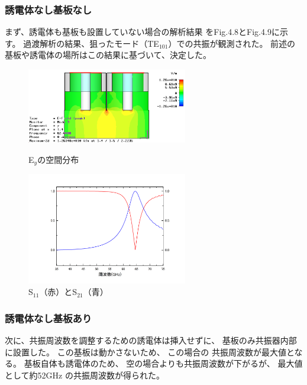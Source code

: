 \subsubsection{誘電体なし基板なし}
まず、誘電体も基板も設置していない場合の解析結果
をFig.4.8とFig.4.9に示す。
過渡解析の結果、狙ったモード（TE$_{101}$）での共振が観測された。
前述の基板や誘電体の場所はこの結果に基づいて、決定した。

\begin{figure}[h]
 \begin{minipage}{0.5\hsize}
  \begin{center}
   \includegraphics[width=70mm]{./image/model73_vac.png}
  \end{center}
  \caption{E$_y$の空間分布}
  \label{fig:one}
 \end{minipage}
 \begin{minipage}{0.5\hsize}
  \begin{center}
   \includegraphics[width=70mm]{./image/Graph1.jpg}
  \end{center}
  \caption{S$_{11}$（赤）とS$_{21}$（青）}
  \label{fig:two}
 \end{minipage}
\end{figure}

\subsubsection{誘電体なし基板あり}
次に、共振周波数を調整するための誘電体は挿入せずに、
基板のみ共振器内部に設置した。
この基板は動かさないため、
この場合の
共振周波数が最大値となる。
基板自体も誘電体のため、
空の場合よりも共振周波数が下がるが、
最大値として約52GHz
の共振周波数が得られた。


